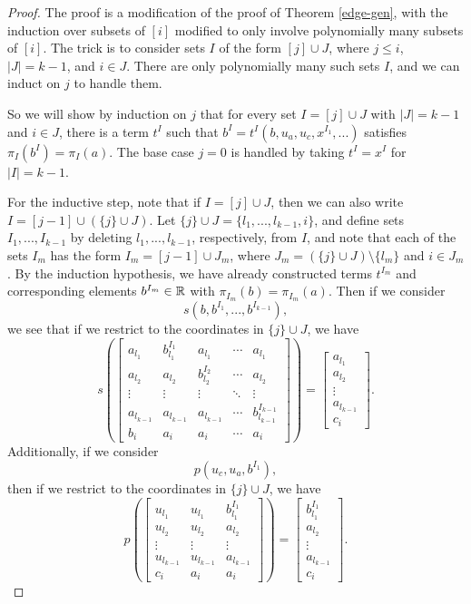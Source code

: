 \documentclass[letterpaper,11pt]{article}
\begin{document}
\begin{proof} The proof is a modification of the proof of Theorem \ref{edge-gen}, with the induction over subsets of $[i]$ modified to only involve polynomially many subsets of $[i]$. The trick is to consider sets $I$ of the form $[j] \cup J$, where $j \le i$, $|J| = k-1$, and $i \in J$. There are only polynomially many such sets $I$, and we can induct on $j$ to handle them.

So we will show by induction on $j$ that for every set $I = [j] \cup J$ with $|J| = k-1$ and $i \in J$, there is a term $t^I$ such that $b^I = t^I(b,u_a,u_c,x^{I_1}, ...)$ satisfies $\pi_I(b^I) = \pi_I(a)$. The base case $j = 0$ is handled by taking $t^I = x^I$ for $|I| = k-1$.

For the inductive step, note that if $I = [j] \cup J$, then we can also write $I = [j-1] \cup (\{j\} \cup J)$. Let $\{j\} \cup J = \{l_1, ..., l_{k-1}, i\}$, and define sets $I_1, ..., I_{k-1}$ by deleting $l_1, ..., l_{k-1}$, respectively, from $I$, and note that each of the sets $I_m$ has the form $I_m = [j-1] \cup J_m$, where $J_m = (\{j\} \cup J)\setminus \{l_m\}$ and $i \in J_m$. By the induction hypothesis, we have already constructed terms $t^{I_m}$ and corresponding elements $b^{I_m} \in \mathbb{R}$ with $\pi_{I_m}(b) = \pi_{I_m}(a)$. Then if we consider
\[
s(b,b^{I_1}, ..., b^{I_{k-1}}),
\]
we see that if we restrict to the coordinates in $\{j\} \cup J$, we have
\[
s\left(\begin{bmatrix} a_{l_1} & b^{I_1}_{l_1} & a_{l_1} & \cdots & a_{l_1}\\ a_{l_2} & a_{l_2} & b^{I_2}_{l_2} & \cdots & a_{l_2}\\ \vdots & \vdots & \vdots & \ddots & \vdots\\ a_{l_{k-1}} & a_{l_{k-1}} & a_{l_{k-1}} & \cdots & b^{I_{k-1}}_{l_{k-1}}\\ b_i & a_i & a_i & \cdots & a_i\end{bmatrix}\right) = \begin{bmatrix} a_{l_1}\\ a_{l_2}\\ \vdots\\ a_{l_{k-1}}\\ c_i\end{bmatrix}.
\]
Additionally, if we consider
\[
p(u_c,u_a,b^{I_1}),
\]
then if we restrict to the coordinates in $\{j\} \cup J$, we have
\[
p\left(\begin{bmatrix} u_{l_1} & u_{l_1} & b^{I_1}_{l_1}\\ u_{l_2} & u_{l_2} & a_{l_2}\\ \vdots & \vdots & \vdots\\ u_{l_{k-1}} & u_{l_{k-1}} & a_{l_{k-1}}\\ c_i & a_i & a_i\end{bmatrix}\right) = \begin{bmatrix} b^{I_1}_{l_1}\\ a_{l_2}\\ \vdots\\ a_{l_{k-1}}\\ c_i\end{bmatrix}.
\]
\end{proof}
\end{document}
